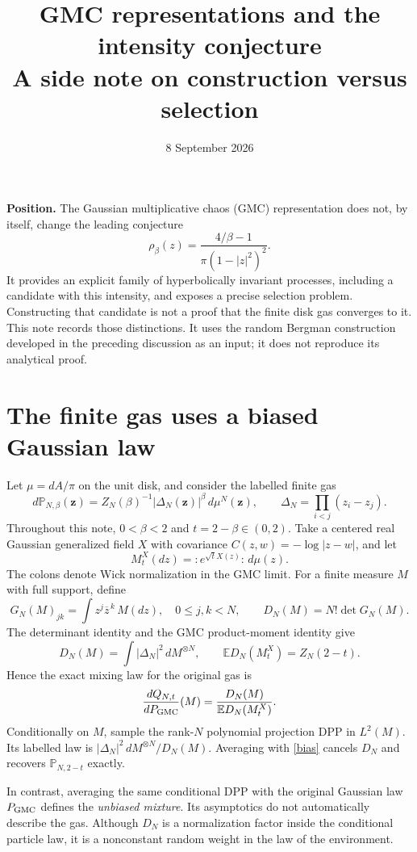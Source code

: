\documentclass[11pt]{article}
\title{GMC representations and the intensity conjecture\\[3pt]\large A side note on construction versus selection}
\author{}
\date{8 September 2026}
\newcommand{\E}{\mathbb E}
\newcommand{\Pp}{\mathbb P}
\begin{document}
\maketitle
\vspace{-1.8em}
\noindent\textbf{Position.}
The Gaussian multiplicative chaos (GMC) representation does not, by itself,
change the leading conjecture
\begin{equation}\label{target}
 \rho_\beta(z)=\frac{4/\beta-1}{\pi(1-|z|^2)^2}.
\end{equation}
It provides an explicit family of hyperbolically invariant processes,
including a candidate with this intensity, and exposes a precise selection
problem. Constructing that candidate is not a proof that the finite disk gas
converges to it. This note records those distinctions. It uses the random
Bergman construction developed in the preceding discussion as an input;
it does not reproduce its analytical proof.

\section{The finite gas uses a biased Gaussian law}
Let $\mu=dA/\pi$ on the unit disk, and consider the labelled finite gas
\[
 d\Pp_{N,\beta}(\mathbf z)
 =Z_N(\beta)^{-1}|\Delta_N(\mathbf z)|^\beta\,d\mu^N(\mathbf z),
 \qquad \Delta_N=\prod_{i<j}(z_i-z_j).
\]
Throughout this note, $0<\beta<2$ and $t=2-\beta\in(0,2)$.
Take a centered real Gaussian generalized field $X$ with covariance
$C(z,w)=-\log|z-w|$, and let
\[
 M_t^X(dz)={:}e^{\sqrt t X(z)}{:}\,d\mu(z).
\]
The colons denote Wick normalization in the GMC limit. For a finite measure
$M$ with full support, define
\[
 G_N(M)_{jk}=\int z^j\overline z^{\,k}\,M(dz),\quad 0\le j,k<N,
 \qquad D_N(M)=N!\det G_N(M).
\]
The determinant identity and the GMC product-moment identity give
\[
 D_N(M)=\int|\Delta_N|^2\,dM^{\otimes N},\qquad
 \E D_N(M_t^X)=Z_N(2-t).
\]
Hence the exact mixing law for the original gas is
\begin{equation}\label{bias}
 \frac{dQ_{N,t}}{dP_{\rm GMC}}(M)
 =\frac{D_N(M)}{\E D_N(M_t^X)}.
\end{equation}
Conditionally on $M$, sample the rank-$N$ polynomial projection DPP in
$L^2(M)$. Its labelled law is
$|\Delta_N|^2\,dM^{\otimes N}/D_N(M)$. Averaging with \eqref{bias}
cancels $D_N$ and recovers $\Pp_{N,2-t}$ exactly.

In contrast, averaging the same conditional DPP with the original Gaussian
law $P_{\rm GMC}$ defines the \emph{unbiased mixture}. Its asymptotics do
not automatically describe the gas. Although $D_N$ is a normalization
factor inside the conditional particle law, it is a nonconstant random
weight in the law of the environment.
\end{document}
